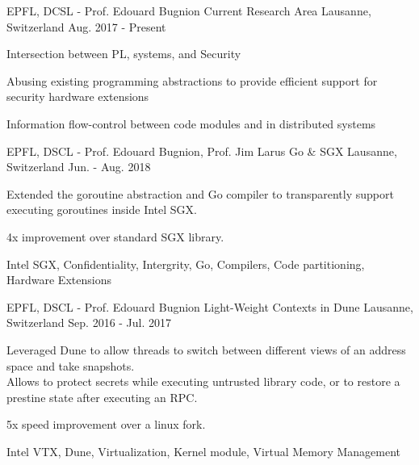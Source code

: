 


\begin{cventries}

\cventry
{EPFL, DCSL - Prof. Edouard Bugnion}
{Current Research Area}
{Lausanne, Switzerland}
{Aug. 2017 - Present}
{ %
	\begin{cvitems}
  \item{Intersection between PL, systems, and Security}
	\item{Abusing existing programming abstractions to provide efficient support for
    security hardware extensions}
  \item{Information flow-control between code modules and in distributed systems}
	\end{cvitems}
}


\cventry
{EPFL, DSCL - Prof. Edouard Bugnion, Prof. Jim Larus}
  {Go \& SGX}
{Lausanne, Switzerland}
{Jun.  - Aug. 2018}
{
	\begin{cvitems}
	\item{Extended the goroutine abstraction and Go compiler to transparently
    support executing goroutines inside Intel SGX.}
  \item{4x improvement over standard SGX library.}
	\item{Intel SGX, Confidentiality, Intergrity, Go, Compilers, Code partitioning, Hardware Extensions}
	\end{cvitems}
}

\cventry
{EPFL, DSCL - Prof. Edouard Bugnion}
{Light-Weight Contexts in Dune}
{Lausanne, Switzerland}
{Sep. 2016 - Jul. 2017}
{
	\begin{cvitems}
  \item{Leveraged Dune to allow threads to switch between different views of
    an address space and take snapshots.\\Allows to protect secrets while executing untrusted library code, or to restore a prestine state after executing an RPC.}
  \item{5x speed improvement over a linux fork.}
	\item{Intel VTX, Dune, Virtualization, Kernel module, Virtual Memory Management}
	\end{cvitems}
}


\end{cventries}
